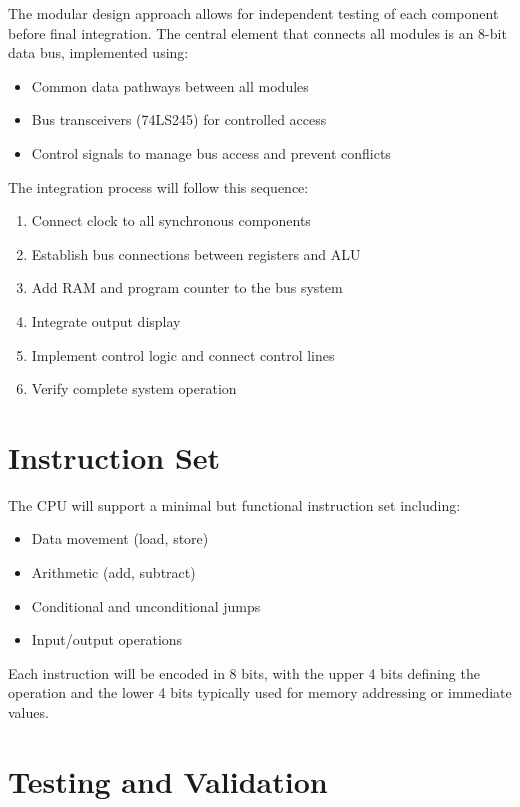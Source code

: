 \documentclass[a4paper,12pt]{article}
\begin{document}
The modular design approach allows for independent testing of each component before final integration. The central element that connects all modules is an 8-bit data bus, implemented using:

\begin{itemize}
    \item Common data pathways between all modules
    \item Bus transceivers (74LS245) for controlled access
    \item Control signals to manage bus access and prevent conflicts
\end{itemize}

The integration process will follow this sequence:
\begin{enumerate}
    \item Connect clock to all synchronous components
    \item Establish bus connections between registers and ALU
    \item Add RAM and program counter to the bus system
    \item Integrate output display
    \item Implement control logic and connect control lines
    \item Verify complete system operation
\end{enumerate}

\section{Instruction Set}

The CPU will support a minimal but functional instruction set including:

\begin{itemize}
    \item Data movement (load, store)
    \item Arithmetic (add, subtract)
    \item Conditional and unconditional jumps
    \item Input/output operations
\end{itemize}

Each instruction will be encoded in 8 bits, with the upper 4 bits defining the operation and the lower 4 bits typically used for memory addressing or immediate values.

\section{Testing and Validation}
\end{document}
